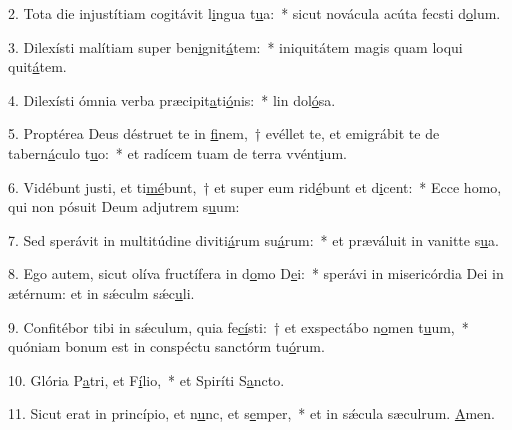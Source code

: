 2. Tota die injustítiam cogitávit l\uline{i}ngua t\uline{u}a:~* sicut novácula acúta fecsti d\uline{o}lum.\par 
3. Dilexísti malítiam super ben\uline{i}gnit\uline{á}tem:~* iniquitátem magis quam loqui quit\uline{á}tem.\par 
4. Dilexísti ómnia verba præcipit\uline{a}ti\uline{ó}nis:~* lin dol\uline{ó}sa.\par 
5. Proptérea Deus déstruet te in \uline{fi}nem,~† evéllet te, et emigrábit te de tabern\uline{á}culo t\uline{u}o:~* et radícem tuam de terra vvént\uline{i}um.\par 
6. Vidébunt justi, et ti\uline{mé}bunt,~† et super eum rid\uline{é}bunt et d\uline{i}cent:~* Ecce homo, qui non pósuit Deum adjutrem s\uline{u}um:\par 
7. Sed sperávit in multitúdine diviti\uline{á}rum su\uline{á}rum:~* et præváluit in vanitte s\uline{u}a.\par 
8. Ego autem, sicut olíva fructífera in d\uline{o}mo D\uline{e}i:~* sperávi in misericórdia Dei in ætérnum: et in sǽculm sǽc\uline{u}li.\par 
9. Confitébor tibi in sǽculum, quia fe\uline{cí}sti:~† et exspectábo n\uline{o}men t\uline{u}um,~* quóniam bonum est in conspéctu sanctórm tu\uline{ó}rum.\par 
10. Glória P\uline{a}tri, et F\uline{í}lio,~* et Spiríti S\uline{a}ncto.\par 
11. Sicut erat in princípio, et n\uline{u}nc, et s\uline{e}mper,~* et in sǽcula sæculrum. \uline{A}men.\par 
